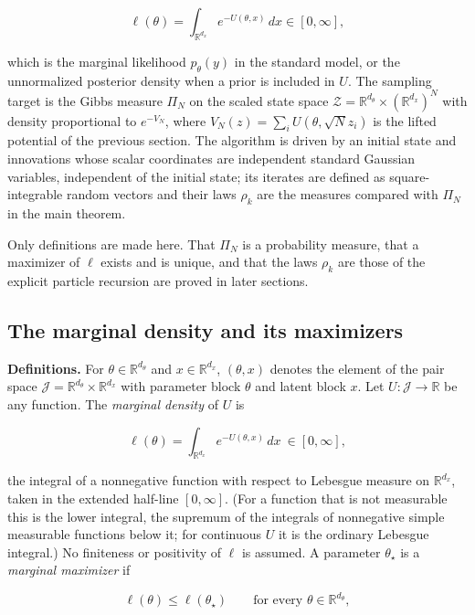 \documentclass[11pt,a4paper]{report}
\begin{document}
\[\ell(\theta)=\int_{\mathbb R^{d_x}}e^{-U(\theta,x)}\,dx\in[0,\infty],\]


which is the marginal likelihood \(p_\theta(y)\) in the standard model, or the unnormalized posterior density when a prior is included in \(U\). The sampling target is the Gibbs measure \(\Pi_N\) on the scaled state space \(\mathcal Z=\mathbb R^{d_\theta}\times(\mathbb R^{d_x})^N\) with density proportional to \(e^{-V_N}\), where \(V_N(z)=\sum_iU(\theta,\sqrt Nz_i)\) is the lifted potential of the previous section. The algorithm is driven by an initial state and innovations whose scalar coordinates are independent standard Gaussian variables, independent of the initial state; its iterates are defined as square-integrable random vectors and their laws \(\rho_k\) are the measures compared with \(\Pi_N\) in the main theorem.




Only definitions are made here. That \(\Pi_N\) is a probability measure, that a maximizer of \(\ell\) exists and is unique, and that the laws \(\rho_k\) are those of the explicit particle recursion are proved in later sections.

\subsection{\texorpdfstring{The marginal density and its maximizers}{The marginal density and its maximizers}}
\label{report-step-IPLA-Model-lean-1}


\textbf{Definitions.} For \(\theta\in\mathbb R^{d_\theta}\) and \(x\in\mathbb R^{d_x}\), \((\theta,x)\) denotes the element of the pair space \(\mathcal J=\mathbb R^{d_\theta}\times\mathbb R^{d_x}\) with parameter block \(\theta\) and latent block \(x\). Let \(U:\mathcal J\to\mathbb R\) be any function. The \emph{marginal density} of \(U\) is


\[\ell(\theta)=\int_{\mathbb R^{d_x}}e^{-U(\theta,x)}\,dx\ \in[0,\infty],\]


the integral of a nonnegative function with respect to Lebesgue measure on \(\mathbb R^{d_x}\), taken in the extended half-line \([0,\infty]\). (For a function that is not measurable this is the lower integral, the supremum of the integrals of nonnegative simple measurable functions below it; for continuous \(U\) it is the ordinary Lebesgue integral.) No finiteness or positivity of \(\ell\) is assumed. A parameter \(\theta_\star\) is a \emph{marginal maximizer} if


\[\ell(\theta)\le\ell(\theta_\star)\qquad\text{for every }\theta\in\mathbb R^{d_\theta},\]
\end{document}
